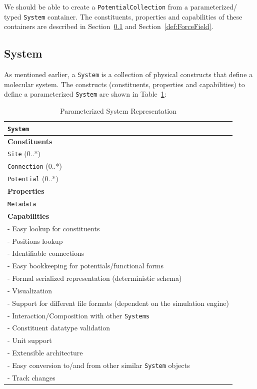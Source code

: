 \documentclass[12pt]{article}
\begin{document}
We should be able to create a \texttt{PotentialCollection} from a parameterized/ typed \texttt{System} container. The constituents, properties and capabilities of these containers are described in Section~\ref{def:Topology} and Section~\ref{def:ForceField}.

\subsection{System}
\label{def:Topology}
As mentioned earlier, a \texttt{System} is a collection of physical constructs that define a molecular system. The constructs (constituents, properties and capabilities) to define a parameterized \texttt{System} are shown in  Table~\ref{tab:TopologySpec}:

\begin{table}[ht]
    \centering
     \caption{Parameterized System Representation}
    \begin{tabular}{|l|}
         \hline
         \rowcolor{gray!50}
        \texttt{System}  \\
         \hline
         \textbf{Constituents} \\
         \texttt{Site} (0..*) \\
         \texttt{Connection} (0..*)\\
         \texttt{Potential} (0..*)\\
         \hline
         \textbf{Properties}\\
         \texttt{Metadata} \\
         \hline
         \textbf{Capabilities}\\
         \hline
         - Easy lookup for constituents \\
         - Positions lookup \\
         - Identifiable connections \\
         - Easy bookkeeping for potentials/functional forms \\
         - Formal serialized representation (deterministic schema) \\
         - Visualization \\
         - Support for different file formats (dependent on the simulation engine) \\
         - Interaction/Composition with other \texttt{Systems}\\
         - Constituent datatype validation \\
         - Unit support \\
         - Extensible architecture \\
         - Easy conversion to/and from other similar \texttt{System} objects\\
         - Track changes \\

        \hline

    \end{tabular}
    \label{tab:TopologySpec}
\end{table}
\end{document}
